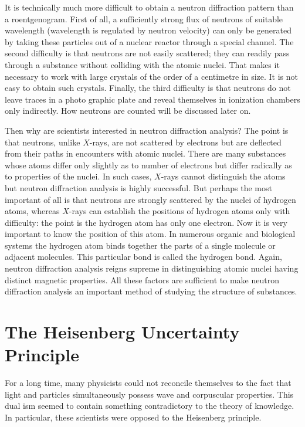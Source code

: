 It is technically much more difficult to obtain a neu­tron diffraction pattern than a roentgenogram. First of all, a sufficiently strong flux of neutrons of suitable wavelength (wavelength is regulated by neutron velocity) can only be generated by taking these particles out of a nuclear reactor through a special channel. The second difficulty is that neutrons are not easily scattered; they can readily pass through a substance without colliding with the atomic nuclei. That makes it necessary to work with large crystals of the order of a centimetre in size. It is not easy to obtain such crystals. Finally, the third difficulty is that neutrons do not leave traces in a photo­ graphic plate and reveal themselves in ionization chambers only indirectly. How neutrons are counted will be discussed later on.

Then why are scientists interested in neutron diffraction analysis? The point is that neutrons, unlike $X$-rays, are not scattered by electrons but are deflected from their paths in encounters with atomic nuclei. There are many substances whose atoms differ only slightly as to number of electrons but differ radically as to properties of the nuclei. In such cases, $X$-rays cannot distinguish the atoms but neutron diffraction analysis is highly success­ful. But perhaps the most important of all is that neu­trons are strongly scattered by the nuclei of hydrogen atoms, whereas $X$-rays can establish the positions of hydrogen atoms only with difficulty: the point is the hydrogen atom has only one electron. Now it is very important to know the position of this atom. In numerous organic and biological systems the hydrogen atom binds together the parts of a single molecule or adjacent mole­cules. This particular bond is called the hydrogen bond. Again, neutron diffraction analysis reigns supreme in distinguishing atomic nuclei having distinct magnetic properties. All these factors are sufficient to make neu­tron diffraction analysis an important method of studying the structure of substances.


\section{The Heisenberg Uncertainty Principle}

For a long time, many physicists could not reconcile themselves to the fact that light and particles simultane­ously possess wave and corpuscular properties. This dual­ ism seemed to contain something contradictory to the theory of knowledge. In particular, these scientists were opposed to the Heisenberg principle.

